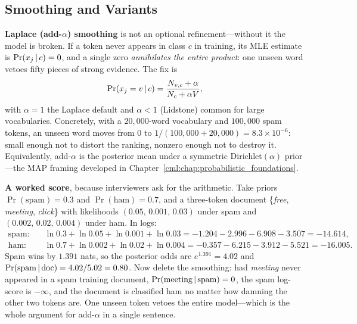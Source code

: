 \subsection{Smoothing and Variants}

\textbf{Laplace (add-$\alpha$) smoothing} is not an optional refinement---without it the model is broken. If a token never appears in class $c$ in training, its MLE estimate is $\Pr(x_j\,|\, c) = 0$, and a single zero \emph{annihilates the entire product}: one unseen word vetoes fifty pieces of strong evidence. The fix is
\begin{equation}
\Pr(x_j = v\,|\, c) = \frac{N_{v,c} + \alpha}{N_c + \alpha V},
\end{equation}
with $\alpha = 1$ the Laplace default and $\alpha < 1$ (Lidstone) common for large vocabularies. Concretely, with a $20{,}000$-word vocabulary and $100{,}000$ spam tokens, an unseen word moves from $0$ to $1/(100{,}000 + 20{,}000) = 8.3\times10^{-6}$: small enough not to distort the ranking, nonzero enough not to destroy it. Equivalently, add-$\alpha$ is the posterior mean under a symmetric Dirichlet$(\alpha)$ prior---the MAP framing developed in Chapter~\ref{cml:chap:probabilistic_foundations}.

\textbf{A worked score}, because interviewers ask for the arithmetic. Take priors $\Pr(\text{spam})=0.3$ and $\Pr(\text{ham})=0.7$, and a three-token document \{\emph{free}, \emph{meeting}, \emph{click}\} with likelihoods $(0.05,\,0.001,\,0.03)$ under spam and $(0.002,\,0.02,\,0.004)$ under ham. In logs:
\begin{align*}
\text{spam:}\quad & \ln 0.3 + \ln 0.05 + \ln 0.001 + \ln 0.03 = -1.204 - 2.996 - 6.908 - 3.507 = -14.614,\\
\text{ham:}\quad & \ln 0.7 + \ln 0.002 + \ln 0.02 + \ln 0.004 = -0.357 - 6.215 - 3.912 - 5.521 = -16.005 .
\end{align*}
Spam wins by $1.391$ nats, so the posterior odds are $e^{1.391} = 4.02$ and $\Pr(\text{spam}\,|\, \text{doc}) = 4.02/5.02 = 0.80$. Now delete the smoothing: had \emph{meeting} never appeared in a spam training document, $\Pr(\text{meeting}\,|\,\text{spam}) = 0$, the spam log-score is $-\infty$, and the document is classified ham no matter how damning the other two tokens are. One unseen token vetoes the entire model---which is the whole argument for add-$\alpha$ in a single sentence.

